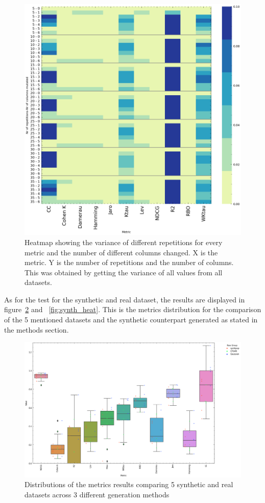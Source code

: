 \begin{figure}[htbp]
    \centering
    \caption{Heatmap showing the variance of different repetitions for every metric and the number of different columns changed. X is the metric. Y is the number of repetitions and the number of columns. This was obtained by getting the variance of all values from all datasets.  }\label{fig:facet_plot} 
    \includegraphics[scale=0.60]{figures/heatmap-runs.png}
    \end{figure}

As for the test for the synthetic and real dataset, the results are displayed in figure~\ref{fig:synth_result} and ~\ref{fig:synth_heat}. This is the metrics distribution for the comparison of the 5 mentioned datasets and the synthetic counterpart generated as stated in the methods section.
\begin{figure}[htbp]
    \centering
    \caption{Distributions of the metrics results comparing 5 synthetic and real datasets across 3 different generation methods}\label{fig:synth_result} 
    \includegraphics[scale=0.60]{figures/synthetic_violin_swarm_colored_by_group_custom.png}
    \end{figure}
    
